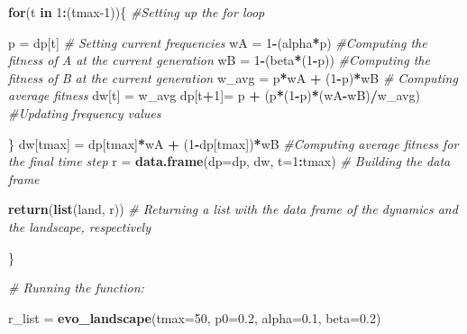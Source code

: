 \documentclass[
]{book}
\newenvironment{Shaded}{\begin{snugshade}}{\end{snugshade}}
\newcommand{\AttributeTok}[1]{\textcolor[rgb]{0.13,0.29,0.53}{#1}}
\newcommand{\CommentTok}[1]{\textcolor[rgb]{0.56,0.35,0.01}{\textit{#1}}}
\newcommand{\ControlFlowTok}[1]{\textcolor[rgb]{0.13,0.29,0.53}{\textbf{#1}}}
\newcommand{\DecValTok}[1]{\textcolor[rgb]{0.00,0.00,0.81}{#1}}
\newcommand{\FloatTok}[1]{\textcolor[rgb]{0.00,0.00,0.81}{#1}}
\newcommand{\FunctionTok}[1]{\textcolor[rgb]{0.13,0.29,0.53}{\textbf{#1}}}
\newcommand{\NormalTok}[1]{#1}
\newcommand{\OtherTok}[1]{\textcolor[rgb]{0.56,0.35,0.01}{#1}}
\newcommand{\SpecialCharTok}[1]{\textcolor[rgb]{0.81,0.36,0.00}{\textbf{#1}}}
\begin{document}
\begin{Shaded}
\begin{Highlighting}[]
  \ControlFlowTok{for}\NormalTok{(t }\ControlFlowTok{in} \DecValTok{1}\SpecialCharTok{:}\NormalTok{(tmax}\DecValTok{{-}1}\NormalTok{))\{ }\CommentTok{\#Setting up the for loop}
  
\NormalTok{  p }\OtherTok{=}\NormalTok{ dp[t] }\CommentTok{\# Setting current frequencies}
\NormalTok{  wA }\OtherTok{=} \DecValTok{1}\SpecialCharTok{{-}}\NormalTok{(alpha}\SpecialCharTok{*}\NormalTok{p) }\CommentTok{\#Computing the fitness of A at the current generation}
\NormalTok{  wB }\OtherTok{=} \DecValTok{1}\SpecialCharTok{{-}}\NormalTok{(beta}\SpecialCharTok{*}\NormalTok{(}\DecValTok{1}\SpecialCharTok{{-}}\NormalTok{p)) }\CommentTok{\#Computing the fitness of B at the current generation}
\NormalTok{  w\_avg }\OtherTok{=}\NormalTok{ p}\SpecialCharTok{*}\NormalTok{wA }\SpecialCharTok{+}\NormalTok{ (}\DecValTok{1}\SpecialCharTok{{-}}\NormalTok{p)}\SpecialCharTok{*}\NormalTok{wB }\CommentTok{\# Computing average fitness}
\NormalTok{  dw[t] }\OtherTok{=}\NormalTok{ w\_avg}
\NormalTok{  dp[t}\SpecialCharTok{+}\DecValTok{1}\NormalTok{]}\OtherTok{=}\NormalTok{ p }\SpecialCharTok{+}\NormalTok{ (p}\SpecialCharTok{*}\NormalTok{(}\DecValTok{1}\SpecialCharTok{{-}}\NormalTok{p)}\SpecialCharTok{*}\NormalTok{(wA}\SpecialCharTok{{-}}\NormalTok{wB)}\SpecialCharTok{/}\NormalTok{w\_avg) }\CommentTok{\#Updating frequency values}
  
\NormalTok{\}}
\NormalTok{  dw[tmax] }\OtherTok{=}\NormalTok{  dp[tmax]}\SpecialCharTok{*}\NormalTok{wA }\SpecialCharTok{+}\NormalTok{ (}\DecValTok{1}\SpecialCharTok{{-}}\NormalTok{dp[tmax])}\SpecialCharTok{*}\NormalTok{wB }\CommentTok{\#Computing average fitness for the final time step}
\NormalTok{  r }\OtherTok{=} \FunctionTok{data.frame}\NormalTok{(}\AttributeTok{dp=}\NormalTok{dp, dw, }\AttributeTok{t=}\DecValTok{1}\SpecialCharTok{:}\NormalTok{tmax) }\CommentTok{\# Building the data frame}
  
  \FunctionTok{return}\NormalTok{(}\FunctionTok{list}\NormalTok{(land, r)) }\CommentTok{\# Returning a list with the data frame of the dynamics and the landscape, respectively}
  
\NormalTok{\}}

\CommentTok{\# Running the function:}

\NormalTok{r\_list }\OtherTok{=} \FunctionTok{evo\_landscape}\NormalTok{(}\AttributeTok{tmax=}\DecValTok{50}\NormalTok{, }\AttributeTok{p0=}\FloatTok{0.2}\NormalTok{, }\AttributeTok{alpha=}\FloatTok{0.1}\NormalTok{, }\AttributeTok{beta=}\FloatTok{0.2}\NormalTok{)}


\end{Highlighting}
\end{Shaded}
\end{document}
